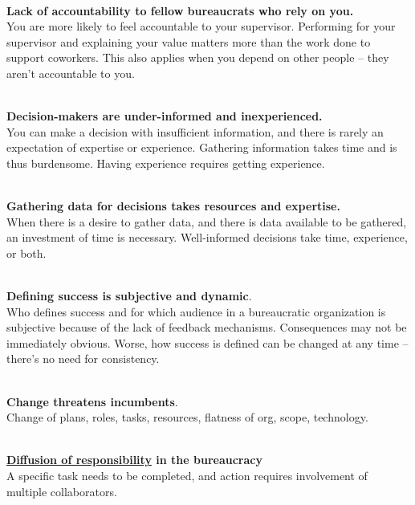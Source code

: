 \ \\

\begin{samepage}
\textbf{Lack of accountability to fellow bureaucrats who rely on you.}\\
You are more likely to feel accountable to your supervisor. Performing for your supervisor and explaining your value matters more than the work done to support coworkers.  This also applies when you depend on other people -- they aren't accountable to you.
\end{samepage}

\ \\

\textbf{Decision-makers are under-informed and inexperienced.}\\
You can make a decision with insufficient information, and there is rarely an expectation of expertise or experience. 
Gathering information takes time and is thus burdensome.
Having experience requires getting experience.

\ \\

\textbf{Gathering data for decisions takes resources and expertise.}\\
When there is a desire to gather data, and there is data available to be gathered, an investment of time is necessary. Well-informed decisions take time, experience, or both.

\ \\

\textbf{Defining success is subjective and dynamic}. \\
Who defines success and for which audience in a bureaucratic organization is subjective because of the lack of feedback mechanisms. Consequences may not be immediately obvious. Worse, how success is defined can be changed at any time -- there's no need for consistency. 

\ \\

\textbf{Change threatens incumbents}. \\
Change of plans, roles, tasks, resources, flatness of org, scope, technology.

\ \\

\textbf{\href{https://en.wikipedia.org/wiki/Diffusion_of_responsibility}{Diffusion of responsibility} in the bureaucracy} \\
A specific task needs to be completed, and action requires involvement of multiple collaborators. 


